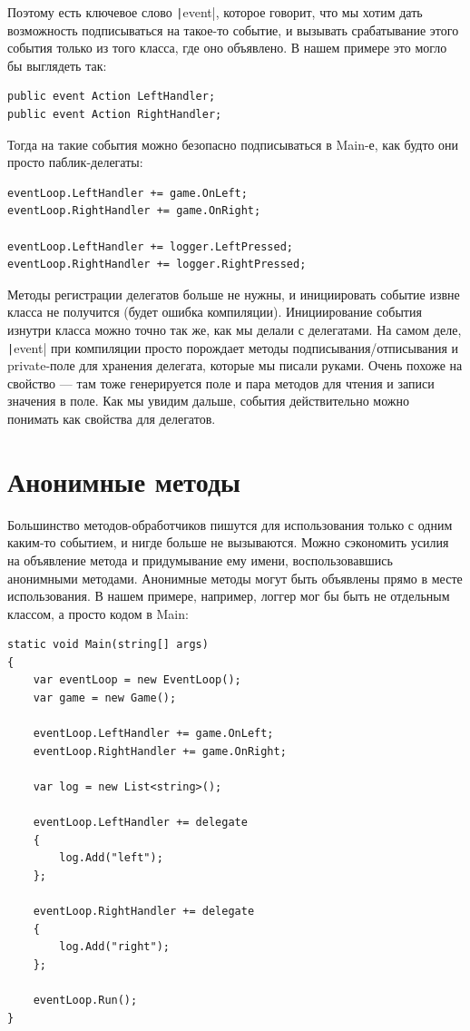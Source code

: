\documentclass{../../text-style}
\begin{document}
Поэтому есть ключевое слово \texttt|event|, которое говорит, что мы хотим дать возможность подписываться на такое-то событие, и вызывать срабатывание этого события только из того класса, где оно объявлено. В нашем примере это могло бы выглядеть так:

\begin{verbatim}
public event Action LeftHandler;
public event Action RightHandler;
\end{verbatim}

Тогда на такие события можно безопасно подписываться в Main-е, как будто они просто паблик-делегаты:

\begin{verbatim}
eventLoop.LeftHandler += game.OnLeft;
eventLoop.RightHandler += game.OnRight;

eventLoop.LeftHandler += logger.LeftPressed;
eventLoop.RightHandler += logger.RightPressed;
\end{verbatim}

Методы регистрации делегатов больше не нужны, и инициировать событие извне класса не получится (будет ошибка компиляции). Инициирование события изнутри класса можно точно так же, как мы делали с делегатами. На самом деле, \texttt|event| при компиляции просто порождает методы подписывания/отписывания и private-поле для хранения делегата, которые мы писали руками. Очень похоже на свойство --- там тоже генерируется поле и пара методов для чтения и записи значения в поле. Как мы увидим дальше, события действительно можно понимать как свойства для делегатов.

\section{Анонимные методы}

Большинство методов-обработчиков пишутся для использования только с одним каким-то событием, и нигде больше не вызываются. Можно сэкономить усилия на объявление метода и придумывание ему имени, воспользовавшись анонимными методами. Анонимные методы могут быть объявлены прямо в месте использования. В нашем примере, например, логгер мог бы быть не отдельным классом, а просто кодом в Main:

\begin{verbatim}
static void Main(string[] args)
{
    var eventLoop = new EventLoop();
    var game = new Game();

    eventLoop.LeftHandler += game.OnLeft;
    eventLoop.RightHandler += game.OnRight;

    var log = new List<string>();

    eventLoop.LeftHandler += delegate 
    {
        log.Add("left");
    };

    eventLoop.RightHandler += delegate
    {
        log.Add("right");
    };

    eventLoop.Run();
}
\end{verbatim}
\end{document}
